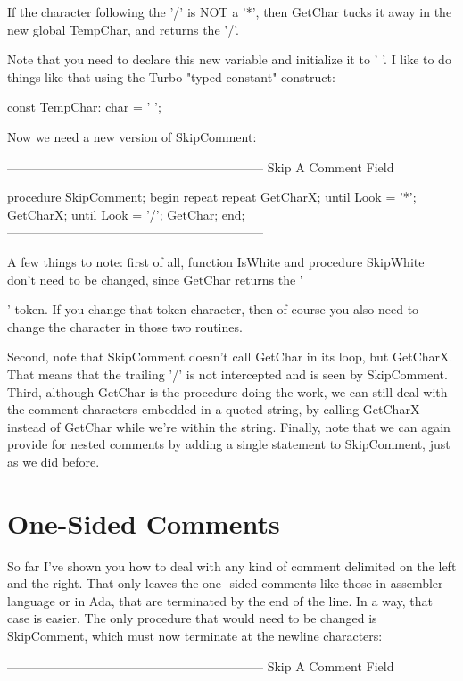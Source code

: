 \documentclass[float=false, crop=false]{standalone}
\begin{document}
{{{If the character following the '/' is NOT a '*', then GetChar tucks it away in
the new global TempChar, and returns the '/'.

Note that you need to declare this new variable and initialize it to ' '. I like
to do things like that using the Turbo "typed constant" construct:


     const TempChar: char = ' ';


Now we need a new version of SkipComment:

\begin{code}
{--------------------------------------------------------------}
{ Skip A Comment Field }

procedure SkipComment;
begin
   repeat
      repeat
         GetCharX;
      until Look = '*';
      GetCharX;
   until Look = '/';
   GetChar;
end;
{--------------------------------------------------------------}
\end{code}

A few things to note: first of all, function IsWhite and procedure SkipWhite
don't need to be changed, since GetChar returns the '{' token. If you change
that token character, then of course you also need to change the character in
those two routines.

Second, note that SkipComment doesn't call GetChar in its loop, but GetCharX.
That means that the trailing '/' is not intercepted and is seen by SkipComment.
Third, although GetChar is the procedure doing the work, we can still deal with
the comment characters embedded in a quoted string, by calling GetCharX instead
of GetChar while we're within the string. Finally, note that we can again
provide for nested comments by adding a single statement to SkipComment, just as
we did before.


\section{One-Sided Comments}

So far I've shown you how to deal with any kind of comment delimited on the left
and the right. That only leaves the one- sided comments like those in assembler
language or in Ada, that are terminated by the end of the line. In a way, that
case is easier. The only procedure that would need to be changed is SkipComment,
which must now terminate at the newline characters:

\begin{code}
{--------------------------------------------------------------}
{ Skip A Comment Field }


\end{code}}}}}
\end{document}
